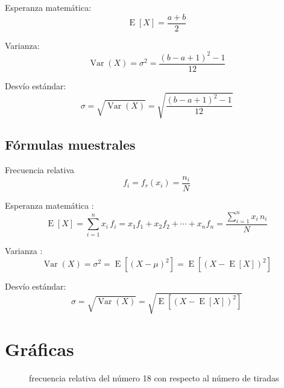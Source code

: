 Esperanza matemática:
\begin{equation}
\operatorname{E}[X] = \frac{a+b}{2}
\end{equation}

Varianza:
\begin{equation}
\operatorname{Var}(X) = \sigma^{2} = \frac{(b-a+1)^{2}-1}{12}
\end{equation}

Desvío estándar:
\begin{equation}
\sigma = \sqrt{\operatorname{Var}(X)} = \sqrt{\frac{(b-a+1)^{2}-1}{12}}
\end{equation}

\subsection{Fórmulas muestrales}
Frecuencia relativa \cite{wiki-frecuencia}
\begin{equation}
f_{i} = f_{r}(x_{i}) = \frac {n_{i}}{N}
\end{equation}

Esperanza matemática \cite{wiki-esperanza}:
\begin{equation}
\operatorname{E}[X] = \sum_{i=1}^{n}x_{i}\,f_{i}=x_{1}f_{1}+x_{2}f_{2}+\cdots +x_{n}f_{n} = \frac{\sum_{i=1}^{n}x_{i}\,n_{i}}{N}
\end{equation}

Varianza \cite{wiki-varianza}:
\begin{equation}
\operatorname{Var}(X) = \sigma^{2} = \operatorname{E}\left[(X - \mu)^{2}\right] = \operatorname{E}\left[(X - \operatorname{E}[X])^{2}\right]
\end{equation}

Desvío estándar:
\begin{equation}
\sigma = \sqrt{\operatorname{Var}(X)} = \sqrt{\operatorname{E}\left[(X - \operatorname{E}[X])^{2}\right]}
\end{equation}

\section{Gráficas}
\begin{figure}[H]
  \begin{mytikzresize}{0.8\textwidth}
    \centering
    
    \caption{frecuencia relativa del número 18 con respecto al número de tiradas}
  \end{mytikzresize}
\end{figure}

